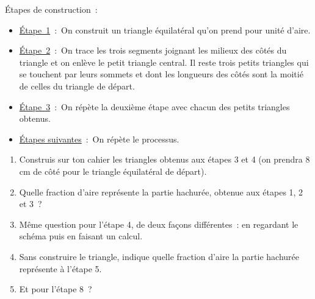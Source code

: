\begin{exercice}
Étapes de construction :
\begin{itemize}
 \item \underline{Étape 1} : On construit un triangle équilatéral qu'on prend pour unité d'aire.
 \item \underline{Étape 2} : On trace les trois segments joignant les milieux des côtés du triangle et on enlève le petit triangle central. Il reste trois petits triangles qui se touchent par leurs sommets et dont les longueurs des côtés sont la moitié de celles du triangle de départ.
 \item \underline{Étape 3} : On répète la deuxième étape avec chacun des petits triangles obtenus.
 \item \underline{Étapes suivantes} : On répète le processus.
 \end{itemize}
\begin{center}  \end{center}
\begin{enumerate}
 \item Construis sur ton cahier les triangles obtenus aux étapes 3 et 4 (on prendra 8 cm de côté pour le triangle équilatéral de départ).
 \item Quelle fraction d'aire représente la partie hachurée, obtenue aux étapes 1, 2 et 3 ?
 \item Même question pour l'étape 4, de deux façons différentes : en regardant le schéma puis en faisant un calcul.
 \item Sans construire le triangle, indique quelle fraction d'aire la partie hachurée représente à l'étape 5.
 \item Et pour l'étape 8 ?
 \end{enumerate}
\end{exercice}

